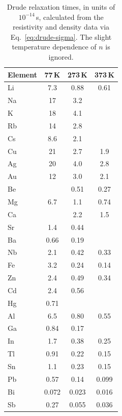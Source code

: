 \begin{table}[ht]
    \centering
    \caption{Drude relaxation times, in units of $10^{-14}$\,s, calculated from the resistivity and density data via Eq.~\eqref{eq:drude-sigma}. The slight temperature dependence of $n$ is ignored.}
    \label{tab:drude-tau}
    \begin{tabular}{lccc}
        \toprule
        Element & 77\,K & 273\,K & 373\,K \\
        \midrule
        Li & 7.3   & 0.88  & 0.61 \\
        Na & 17    & 3.2   & \\
        K  & 18    & 4.1   & \\
        Rb & 14    & 2.8   & \\
        Cs & 8.6   & 2.1   & \\
        Cu & 21    & 2.7   & 1.9 \\
        Ag & 20    & 4.0   & 2.8 \\
        Au & 12    & 3.0   & 2.1 \\
        Be &       & 0.51  & 0.27 \\
        Mg & 6.7   & 1.1   & 0.74 \\
        Ca &       & 2.2   & 1.5 \\
        Sr & 1.4   & 0.44  & \\
        Ba & 0.66  & 0.19  & \\
        Nb & 2.1   & 0.42  & 0.33 \\
        Fe & 3.2   & 0.24  & 0.14 \\
        Zn & 2.4   & 0.49  & 0.34 \\
        Cd & 2.4   & 0.56  & \\
        Hg & 0.71  &       & \\
        Al & 6.5   & 0.80  & 0.55 \\
        Ga & 0.84  & 0.17  & \\
        In & 1.7   & 0.38  & 0.25 \\
        Tl & 0.91  & 0.22  & 0.15 \\
        Sn & 1.1   & 0.23  & 0.15 \\
        Pb & 0.57  & 0.14  & 0.099 \\
        Bi & 0.072 & 0.023 & 0.016 \\
        Sb & 0.27  & 0.055 & 0.036 \\
        \bottomrule
    \end{tabular}
\end{table}

